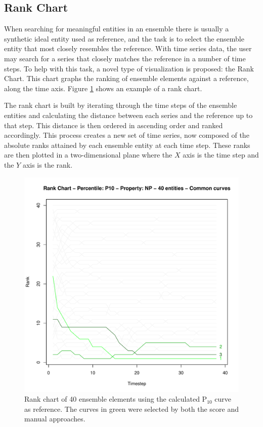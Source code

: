 \documentclass{sigchi-ext}
\begin{document}
\subsection{Rank Chart}
\label{sec:rank}
When searching for meaningful entities in an ensemble there is usually a synthetic ideal entity used as reference, and the task is to select the ensemble entity that most closely resembles the reference. With time series data, the user may search for a series that closely matches the reference in a number of time steps. To help with this task, a novel type of visualization is proposed: the Rank Chart. This chart graphs the ranking of ensemble elements against a reference, along the time axis. Figure \ref{fig:rank-sample} shows an example of a rank chart.

The rank chart is built by iterating through the time steps of the ensemble entities and calculating the distance between each series and the reference up to that step. This distance is then ordered in ascending order and ranked accordingly. This process creates a new set of time series, now composed of the absolute ranks attained by each ensemble entity at each time step. These ranks are then plotted in a two-dimensional plane where the $X$ axis is the time step and the $Y$ axis is the rank.

\begin{figure}
  \centering
  \includegraphics[width=0.7\columnwidth]{rank-common-40.pdf}
  \caption{Rank chart of 40 ensemble elements using the calculated P$_{10}$ curve as reference. The curves in green were selected by both the score and manual approaches.}
  \label{fig:rank-sample}
\end{figure}
\end{document}
